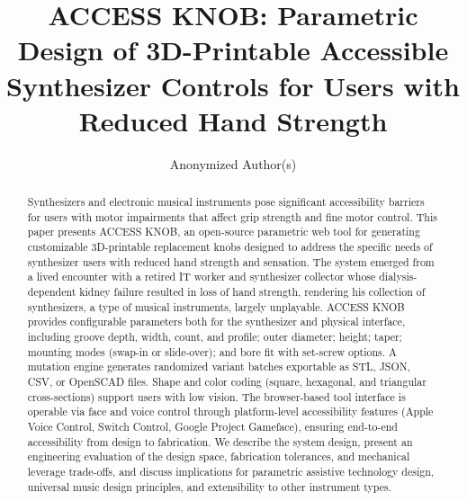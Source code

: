 \documentclass[manuscript,screen,review,anonymous]{acmart}
\begin{document}
\title{ACCESS KNOB: Parametric Design of 3D-Printable Accessible Synthesizer Controls for Users with Reduced Hand Strength}

\author{Anonymized Author(s)}

%
%

\begin{abstract}
Synthesizers and electronic musical instruments pose significant accessibility barriers for users with motor impairments that affect grip strength and fine motor control. This paper presents ACCESS KNOB, an open-source parametric web tool for generating customizable 3D-printable replacement knobs designed to address the specific needs of synthesizer users with reduced hand strength and sensation. The system emerged from a lived encounter with a retired IT worker and synthesizer collector whose dialysis-dependent kidney failure resulted in loss of hand strength, rendering his collection of synthesizers, a type of musical instruments, largely unplayable. ACCESS KNOB provides configurable parameters both for the synthesizer and physical interface, including groove depth, width, count, and profile; outer diameter; height; taper; mounting modes (swap-in or slide-over); and bore fit with set-screw options. A mutation engine generates randomized variant batches exportable as STL, JSON, CSV, or OpenSCAD files. Shape and color coding (square, hexagonal, and triangular cross-sections) support users with low vision. The browser-based tool interface is operable via face and voice control through platform-level accessibility features (Apple Voice Control, Switch Control, Google Project Gameface), ensuring end-to-end accessibility from design to fabrication. We describe the system design, present an engineering evaluation of the design space, fabrication tolerances, and mechanical leverage trade-offs, and discuss implications for parametric assistive technology design, universal music design principles, and extensibility to other instrument types.
\end{abstract}
\end{document}
